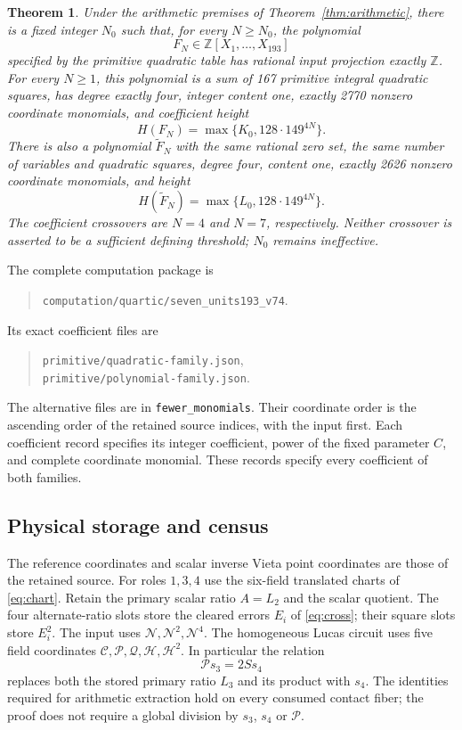 \documentclass[11pt,a4paper]{article}
\newtheorem{theorem}[proposition]{Theorem}
\begin{document}
\begin{theorem}\label{thm:quartic193}
Under the arithmetic premises of Theorem~\ref{thm:arithmetic}, there is a
fixed integer $N_0$ such that, for every $N\ge N_0$, the polynomial
\[
 F_N\in\mathbb Z[X_1,\ldots,X_{193}]
\]
specified by the primitive quadratic table has rational input projection
exactly $\mathbb Z$. For every $N\ge1$, this polynomial is a sum of
167 primitive integral quadratic squares, has degree exactly four,
integer content one, exactly 2770 nonzero coordinate monomials, and
coefficient height
\[
                         H(F_N)=\max\{K_0,128\cdot149^{4N}\}.
\]
There is also a polynomial $\widetilde F_N$ with the same rational zero
set, the same number of variables and quadratic squares, degree four,
content one, exactly 2626 nonzero coordinate monomials, and height
\[
                  H(\widetilde F_N)=\max\{L_0,128\cdot149^{4N}\}.
\]
The coefficient crossovers are $N=4$ and $N=7$, respectively. Neither
crossover is asserted to be a sufficient defining threshold; $N_0$
remains ineffective.
\end{theorem}

The complete computation package is
\begin{quote}\small
\nolinkurl{computation/quartic/seven_units193_v74}.
\end{quote}
Its exact coefficient files are
\begin{quote}\small\raggedright
\nolinkurl{primitive/quadratic-family.json},\\
\nolinkurl{primitive/polynomial-family.json}.
\end{quote}
The alternative files are in \nolinkurl{fewer_monomials}.
Their coordinate order is the ascending
order of the retained source indices, with the input first. Each
coefficient record specifies its integer coefficient, power of the
fixed parameter $C$, and complete coordinate monomial. These records
specify every coefficient of both families.

\subsection{Physical storage and census}
The reference coordinates and scalar inverse Vieta point coordinates are
those of the retained source. For roles $1,3,4$ use the six-field
translated charts of \eqref{eq:chart}. Retain the primary scalar ratio
$A=L_2$ and the scalar quotient. The four alternate-ratio slots store
the cleared errors $E_i$ of \eqref{eq:cross}; their square slots store
$E_i^2$. The input uses $\mathcal N,\mathcal N^2,\mathcal N^4$.
The homogeneous Lucas circuit uses
five field coordinates $\mathcal C,\mathcal P,\mathcal Q,\mathcal H,
\mathcal H^2$. In particular the relation
\[
                         \mathcal P s_3=2Ss_4
\]
replaces both the stored primary ratio $L_3$ and its product with $s_4$.
The identities required for arithmetic extraction hold on every
consumed contact fiber; the proof does not require a global division by
$s_3$, $s_4$ or $\mathcal P$.
\end{document}

